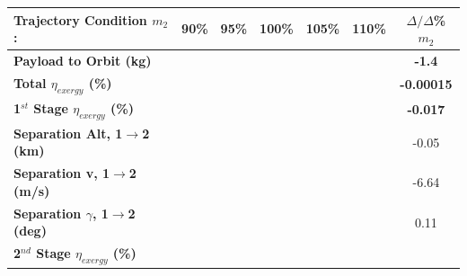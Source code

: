 \begin{table}[ht] %
	\centering
	\begin{tabular}{l c c c c c c} 
		\hline \textbf{Trajectory Condition}   \qquad  $m_{2}$:
		&90\%
		&95\%
		&100\%
		&105\%
		&110\%
		& $\Delta/\Delta$\%$m_{2}$
		\\
		\hline \textbf{Payload to Orbit (kg)}
		& \textbf{\PayloadToOrbitmSPARTANNinety}
		& \textbf{\PayloadToOrbitmSPARTANNinetyFive}
		& \textbf{\PayloadToOrbitmSPARTANStandard}
		& \textbf{\PayloadToOrbitmSPARTANOneHundredFive}
		& \textbf{\PayloadToOrbitmSPARTANOneHundredTen}
		&\textbf{-1.4}
		\\
		\textbf{Total $\eta_{exergy}$ (\%)}
		& \textbf{\totalExergyEffmSPARTANNinety}
		& \textbf{\totalExergyEffmSPARTANNinetyFive}
		& \textbf{\totalExergyEffmSPARTANStandard}
		& \textbf{\totalExergyEffmSPARTANOneHundredFive}
		& \textbf{\totalExergyEffmSPARTANOneHundredTen}
		& \textbf{-0.00015}
		\\
		\hline 
		\textbf{1$^{st}$ Stage $\eta_{exergy}$ (\%)}
		& \textbf{\firstExergyEffmSPARTANNinety}
		& \textbf{\firstExergyEffmSPARTANNinetyFive}
		& \textbf{\firstExergyEffmSPARTANStandard}
		& \textbf{\firstExergyEffmSPARTANOneHundredFive}
		& \textbf{\firstExergyEffmSPARTANOneHundredTen}
		& \textbf{-0.017}
		\\
		\textbf{Separation Alt, 1$\rightarrow$2 (km)}
		& \firstsecondSeparationAltmSPARTANNinety
		& \firstsecondSeparationAltmSPARTANNinetyFive
		& \firstsecondSeparationAltmSPARTANStandard
		& \firstsecondSeparationAltmSPARTANOneHundredFive
		& \firstsecondSeparationAltmSPARTANOneHundredTen
		&-0.05
		\\
		\textbf{Separation v, 1$\rightarrow$2 (m/s)}
		& \firstsecondSeparationvmSPARTANNinety
		& \firstsecondSeparationvmSPARTANNinetyFive
		& \firstsecondSeparationvmSPARTANStandard
		& \firstsecondSeparationvmSPARTANOneHundredFive
		& \firstsecondSeparationvmSPARTANOneHundredTen
		&-6.64
		\\
		\textbf{Separation $\gamma$, 1$\rightarrow$2 (deg)}
		& \firstsecondSeparationgammamSPARTANNinety
		& \firstsecondSeparationgammamSPARTANNinetyFive
		& \firstsecondSeparationgammamSPARTANStandard
		& \firstsecondSeparationgammamSPARTANOneHundredFive
		& \firstsecondSeparationgammamSPARTANOneHundredTen
		&0.11
		\\
		\hline 
		\textbf{2$^{nd}$ Stage $\eta_{exergy}$ (\%)}
		& \textbf{\secondExergyEffmSPARTANNinety}
		& \textbf{\secondExergyEffmSPARTANNinetyFive}
		& \textbf{\secondExergyEffmSPARTANStandard}

\end{tabular}
\end{table}
